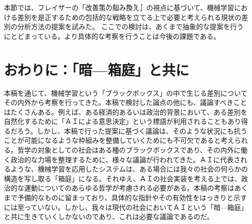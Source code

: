 \documentclass[b5j,twoside,twocolumn]{utarticle}
\begin{document}
本節では、フレイザーの「\.改\.善\.策\.の\.組\.み\.換\.え」の視点に基づいて、機械学習における差別を是正するための包括的な戦略を立てる上で必要と考えられる現状の差別の分析方法の提案を試みた。
ここでの検討は、あくまで抽象的な提案を行うにとどまっている。より具体的な考察を行うことは今後の課題である。











\section{おわりに：「暗---箱庭」と共に}
本稿を通じて、機械学習という「ブラックボックス」の中で生じる差別についてその内外から考察を行ってきた。本稿で検討した論点の他にも、議論すべきことはたくさんある。例えば、ある経済的あるいは政治的背景において、ある差別を自然化するために「ＡＩによる意思決定」という標語が利用されることもあり得るだろう。しかし、本稿で行った提案に基づく議論は、そのような状況にも抗うことが可能になるような枠組みを整備していくためにも不可欠であると考えられる。哲学の対象としての社会はある種のブラックボックスであり、その内外に働く政治的な力場を整理するために、様々な議論が行われてきた。ＡＩに代表されるような、機械学習を応用したシステムは、ある場合には我々の社会の何らかの構造を写し取る「箱庭」になる。それゆえ、ＡＩの社会実装を考える上では、政治的な運動についてのあらゆる哲学が考慮される必要がある。本稿の考察はあくまで予備的なものに留まっており、具体的な指針やその有効性をはっきりと示すには至っていない。しかし、我々は現代の社会においてＡＩという「暗---箱庭」と共に生きていくしかないのであり、これは必要な議論であるのだ。







\end{document}

